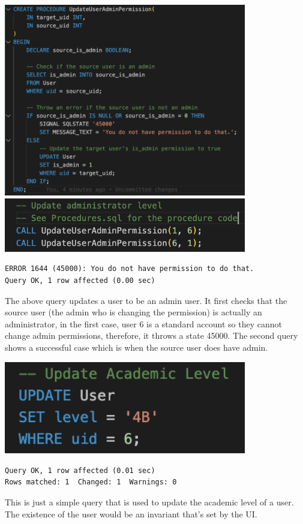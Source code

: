 \documentclass[12pt, a4paper]{article}
\begin{document}
\begin{center}
    \includegraphics[width=400px]{R6/q3_2}
    \includegraphics[width=400px]{R6/q3_1}
    \begin{verbatim}
ERROR 1644 (45000): You do not have permission to do that.
Query OK, 1 row affected (0.00 sec)
    \end{verbatim}
\end{center}
The above query updates a user to be an admin user. It first checks that the source user (the admin who is changing the permission) is actually an administrator, in the first case, user 6 is a standard account so they cannot change admin permissions, therefore, it throws a state 45000. The second query shows a successful case which is when the source user does have admin.

\begin{center}
    \includegraphics[width=400px]{R6/q4}
    \begin{verbatim}
Query OK, 1 row affected (0.01 sec)
Rows matched: 1  Changed: 1  Warnings: 0
    \end{verbatim}
\end{center}
This is just a simple query that is used to update the academic level of a user. The existence of the user would be an invariant that's set by the UI.
\end{document}
